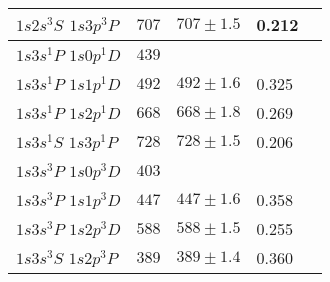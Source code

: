 \documentclass[10pt, twocolumn]{article}
\theoremstyle{definition}
\begin{document}
\begin{table}[h]
\begin{tabular}{p{}p{}p{}p{}p{}}
    \hline
    $1s2s{}^3\!S$ $1s3p{}^3\!P$ & $707$                                              & $707\pm1.5$                                       & 0.212   &                 \\
    \hline
    $1s3s{}^1\!P$ $1s0p{}^1\!D$ & $439$                                              &                                                   &         &                 \\
    \hline
    $1s3s{}^1\!P$ $1s1p{}^1\!D$ & $492$                                              & $492\pm1.6$                                       & 0.325   &                 \\
    \hline
    $1s3s{}^1\!P$ $1s2p{}^1\!D$ & $668$                                              & $668\pm1.8$                                       & 0.269   &                 \\
    \hline
    $1s3s{}^1\!S$ $1s3p{}^1\!P$ & $728$                                              & $728\pm1.5$                                       & 0.206   &                 \\
    \hline
    $1s3s{}^3\!P$ $1s0p{}^3\!D$ & $403$                                              &                                                   &         &                 \\
    \hline
    $1s3s{}^3\!P$ $1s1p{}^3\!D$ & $447$                                              & $447\pm1.6$                                       & 0.358   &                 \\
    \hline
    $1s3s{}^3\!P$ $1s2p{}^3\!D$ & $588$                                              & $588\pm1.5$                                       & 0.255   &                 \\
    \hline
    $1s3s{}^3\!S$ $1s2p{}^3\!P$ & $389$                                              & $389\pm1.4$                                       & 0.360   &                 \\
    \bottomrule
  \end{tabular}
  \label{he-res-table}
\end{table}
\end{document}
